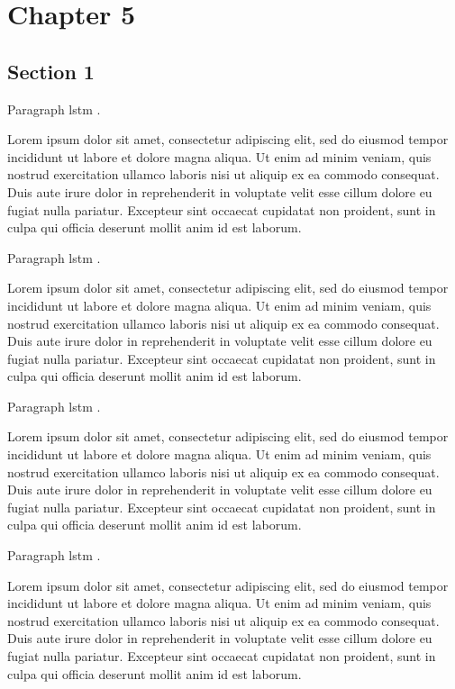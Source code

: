 
\chapter{Chapter 5}

\section{Section 1}

Paragraph
\gls{lstm} \cite{hochreiter1997lstm-1}
\cite{zeyer2018:asr-attention-1}.

Lorem ipsum dolor sit amet, consectetur adipiscing elit,
sed do eiusmod tempor incididunt ut labore et dolore magna aliqua.
Ut enim ad minim veniam, quis nostrud exercitation ullamco laboris nisi ut aliquip ex ea commodo consequat.
Duis aute irure dolor in reprehenderit in voluptate velit esse cillum dolore eu fugiat nulla pariatur.
Excepteur sint occaecat cupidatat non proident, sunt in culpa qui officia deserunt mollit anim id est laborum.

Paragraph
\gls{lstm} \cite{hochreiter1997lstm-2}
\cite{zeyer2018:asr-attention-2}.

Lorem ipsum dolor sit amet, consectetur adipiscing elit,
sed do eiusmod tempor incididunt ut labore et dolore magna aliqua.
Ut enim ad minim veniam, quis nostrud exercitation ullamco laboris nisi ut aliquip ex ea commodo consequat.
Duis aute irure dolor in reprehenderit in voluptate velit esse cillum dolore eu fugiat nulla pariatur.
Excepteur sint occaecat cupidatat non proident, sunt in culpa qui officia deserunt mollit anim id est laborum.

Paragraph
\gls{lstm} \cite{hochreiter1997lstm-3}
\cite{zeyer2018:asr-attention-3}.

Lorem ipsum dolor sit amet, consectetur adipiscing elit,
sed do eiusmod tempor incididunt ut labore et dolore magna aliqua.
Ut enim ad minim veniam, quis nostrud exercitation ullamco laboris nisi ut aliquip ex ea commodo consequat.
Duis aute irure dolor in reprehenderit in voluptate velit esse cillum dolore eu fugiat nulla pariatur.
Excepteur sint occaecat cupidatat non proident, sunt in culpa qui officia deserunt mollit anim id est laborum.

Paragraph
\gls{lstm} \cite{hochreiter1997lstm-4}
\cite{zeyer2018:asr-attention-4}.

Lorem ipsum dolor sit amet, consectetur adipiscing elit,
sed do eiusmod tempor incididunt ut labore et dolore magna aliqua.
Ut enim ad minim veniam, quis nostrud exercitation ullamco laboris nisi ut aliquip ex ea commodo consequat.
Duis aute irure dolor in reprehenderit in voluptate velit esse cillum dolore eu fugiat nulla pariatur.
Excepteur sint occaecat cupidatat non proident, sunt in culpa qui officia deserunt mollit anim id est laborum.

